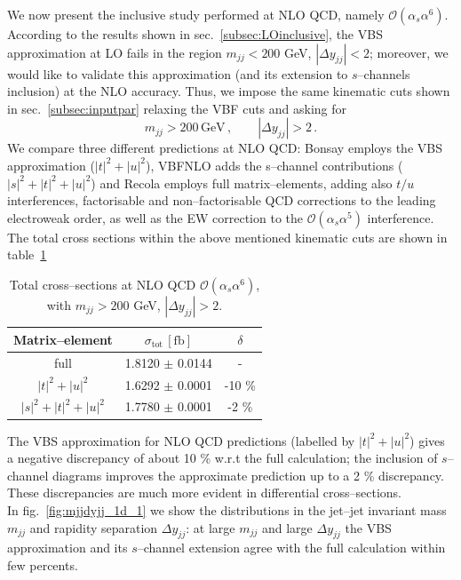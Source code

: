 We now present the inclusive study performed at NLO QCD, namely $\mathcal{O}(\alpha_s\alpha^6)$.\\
According to the results shown in sec.~\ref{subsec:LOinclusive}, the VBS approximation at LO fails in the region $m_{jj} < 200$ GeV, $|\Delta y_{jj}| < 2$; moreover, we would like to validate this approximation (and its extension to $s$--channels inclusion) at the NLO accuracy. Thus, we impose the same kinematic cuts shown in sec.~\ref{subsec:inputpar} relaxing the VBF cuts and asking for
\begin{equation}
	m_{jj} > 200 \,\textrm{GeV}\,,\qquad |\Delta y_{jj}| > 2\,.
\end{equation}
We compare three different predictions at NLO QCD: {\sc Bonsay} employs the VBS approximation ($|t|^2+|u|^2$), {\sc VBFNLO} adds the s--channel contributions ($|s|^2+|t|^2+|u|^2$) and {\sc Recola} employs full matrix--elements, adding also $t/u$ interferences, factorisable and non--factorisable QCD corrections to the leading electroweak order, as well as the EW correction to the $\mathcal{O}(\alpha_s\alpha^5)$ interference. The total cross sections within the above mentioned kinematic cuts are shown in table~\ref{tab:crosssecINCLUSIVE}
\begin{table}[h!]
\centering
\begin{tabular}{c|c|c}
\bf Matrix--element & $\sigma_{\textrm{tot}}\,[\textrm{fb}]$ & $\delta$ \\
\hline
\hline
full &  1.8120 $\pm$ 0.0144 & - \\
\hline
$|t|^2 + |u|^2$ & 1.6292 $\pm$ 0.0001  &  -10 \% \\
\hline
$|s|^2 + |t|^2 + |u|^2$ & 1.7780 $\pm$ 0.0001  & -2 \%
\end{tabular}
\caption{\label{tab:crosssecINCLUSIVE}Total cross--sections at NLO QCD $\mathcal{O}(\alpha_s\alpha^6)$, with $m_{jj}>200$ GeV, $|\Delta y_{jj}|>2$.}
\end{table}
The VBS approximation for NLO QCD predictions (labelled by $|t|^2 + |u|^2$) gives a negative discrepancy of about 10 \% w.r.t the full calculation; the inclusion of $s$--channel diagrams improves the approximate prediction up to a 2 \% discrepancy.\\
These discrepancies are much more evident in differential cross--sections.\\
In fig.~\ref{fig:mjjdyjj_1d_1} we show the distributions in the jet--jet invariant mass $m_{jj}$ and rapidity separation $\Delta y_{jj}$: at large $m_{jj}$ and large $\Delta y_{jj}$ the VBS approximation and its $s$--channel extension agree with the full calculation within few percents.
